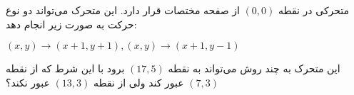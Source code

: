 متحرکی در نقطه
$(0, 0)$ 
 از صفحه مختصات قرار دارد. این متحرک می‌تواند دو نوع حرکت به صورت زیر انجام دهد:
	\p
    \centerline{$(x,y) \to (x+1, y+1), (x,y) \to (x+1, y-1)$}
	\p
    این  متحرک به چند روش می‌تواند به نقطه 
$(17, 5)$ 
    برود با این شرط که از نقطه
$(7, 3)$ 
    عبور کند ولی از نقطه
$(13, 3)$ 
     عبور نکند؟